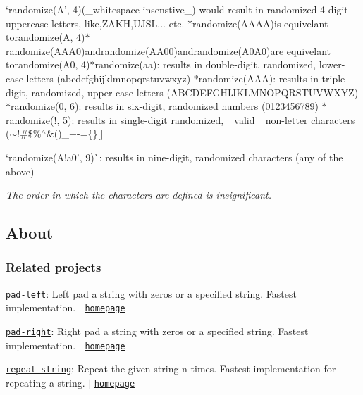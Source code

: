 \begin{DoxyItemize}
\item `randomize(\textquotesingle{}A', 4){\ttfamily (\+\_\+whitespace insenstive\+\_\+) would result in randomized 4-\/digit uppercase letters, like,}Z\+A\+KH{\ttfamily ,}U\+J\+SL{\ttfamily ... etc. $\ast$}randomize(\textquotesingle{}A\+A\+AA\textquotesingle{}){\ttfamily is equivelant to}randomize(\textquotesingle{}A\textquotesingle{}, 4){\ttfamily  $\ast$}randomize(\textquotesingle{}A\+A\+A0\textquotesingle{}){\ttfamily and}randomize(\textquotesingle{}A\+A00\textquotesingle{}){\ttfamily and}randomize(\textquotesingle{}A0\+A0\textquotesingle{}){\ttfamily are equivelant to}randomize(\textquotesingle{}A0\textquotesingle{}, 4){\ttfamily  $\ast$}randomize(\textquotesingle{}aa\textquotesingle{}){\ttfamily \+: results in double-\/digit, randomized, lower-\/case letters (}abcdefghijklmnopqrstuvwxyz{\ttfamily ) $\ast$}randomize(\textquotesingle{}A\+AA\textquotesingle{}){\ttfamily \+: results in triple-\/digit, randomized, upper-\/case letters (}A\+B\+C\+D\+E\+F\+G\+H\+I\+J\+K\+L\+M\+N\+O\+P\+Q\+R\+S\+T\+U\+V\+W\+X\+YZ{\ttfamily ) $\ast$}randomize(\textquotesingle{}0\textquotesingle{}, 6){\ttfamily \+: results in six-\/digit, randomized numbers (}0123456789{\ttfamily ) $\ast$}randomize(\textquotesingle{}!\textquotesingle{}, 5){\ttfamily \+: results in single-\/digit randomized, \+\_\+valid\+\_\+ non-\/letter characters (}$\sim$!\#\$\%$^\wedge$\&()\+\_\++-\/=\{\}\mbox{[}\mbox{]}
\item `randomize(\textquotesingle{}A!a0', 9)\`{}\+: results in nine-\/digit, randomized characters (any of the above)
\end{DoxyItemize}

{\itshape The order in which the characters are defined is insignificant.}

\subsection*{About}

\subsubsection*{Related projects}


\begin{DoxyItemize}
\item \href{https://www.npmjs.com/package/pad-left}{\tt pad-\/left}\+: Left pad a string with zeros or a specified string. Fastest implementation. $\vert$ \href{https://github.com/jonschlinkert/pad-left}{\tt homepage}
\item \href{https://www.npmjs.com/package/pad-right}{\tt pad-\/right}\+: Right pad a string with zeros or a specified string. Fastest implementation. $\vert$ \href{https://github.com/jonschlinkert/pad-right}{\tt homepage}
\item \href{https://www.npmjs.com/package/repeat-string}{\tt repeat-\/string}\+: Repeat the given string n times. Fastest implementation for repeating a string. $\vert$ \href{https://github.com/jonschlinkert/repeat-string}{\tt homepage}
\end{DoxyItemize}

